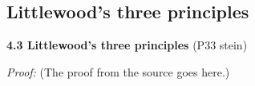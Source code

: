 \subsection{Littlewood's three principles}
\label{cite_th:lw3p}

\textbf{4.3 Littlewood’s three principles} (P33 stein)


\textit{Proof:} (The proof from the source goes here.)